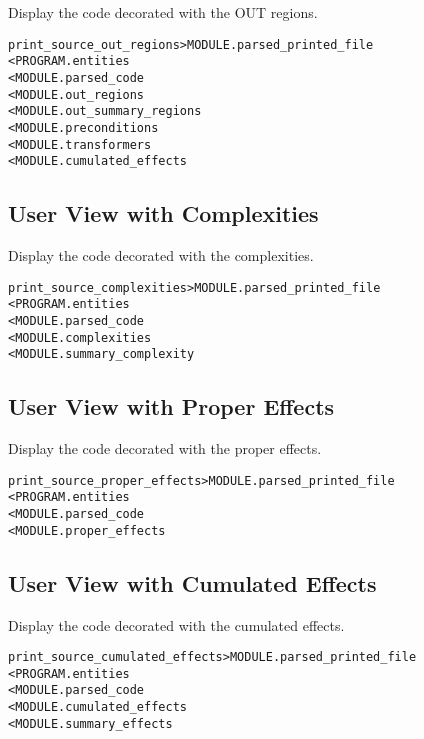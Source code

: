 \documentclass[a4paper]{report}
\newenvironment{PipsMake}{\begin{alltt}}{\end{alltt}}
\begin{document}
Display the code decorated with the OUT regions.

\begin{PipsMake}
print_source_out_regions              > MODULE.parsed_printed_file
        < PROGRAM.entities
        < MODULE.parsed_code
        < MODULE.out_regions
        < MODULE.out_summary_regions
        < MODULE.preconditions
        < MODULE.transformers
        < MODULE.cumulated_effects
\end{PipsMake}


\subsection{User View with Complexities}

Display the code decorated with the complexities.

\begin{PipsMake}
print_source_complexities         > MODULE.parsed_printed_file
        < PROGRAM.entities
        < MODULE.parsed_code
        < MODULE.complexities
        < MODULE.summary_complexity
\end{PipsMake}

\subsection{User View with Proper Effects}

Display the code decorated with the proper effects.

\begin{PipsMake}
print_source_proper_effects       > MODULE.parsed_printed_file
        < PROGRAM.entities
        < MODULE.parsed_code
        <  MODULE.proper_effects
\end{PipsMake}

\subsection{User View with Cumulated Effects}

Display the code decorated with the cumulated effects.

\begin{PipsMake}
print_source_cumulated_effects    > MODULE.parsed_printed_file
        < PROGRAM.entities
        < MODULE.parsed_code
        < MODULE.cumulated_effects
        < MODULE.summary_effects
\end{PipsMake}
\end{document}
